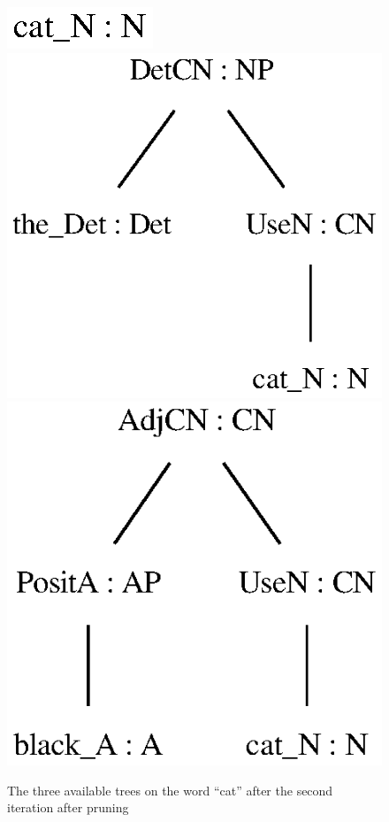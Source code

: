 \begin{figure}[H]
    \centering
        {\includegraphics[scale=0.75]{thesis/figure/black_cats/cat_N_gf.eps}}
        {\includegraphics[scale=0.75]{thesis/figure/black_cats/the_cat_NP_gf.eps}}
        {\includegraphics[scale=0.75]{thesis/figure/black_cats/black_cat_CN_gf.eps}}
    \caption{The three available trees on the word ``cat'' after the second iteration after pruning}\label{fig:cat iter 2 pruned}
\end{figure}

